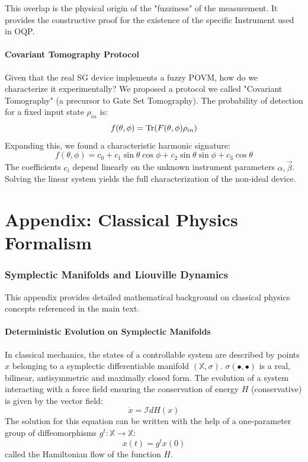 \documentclass[11pt,a4paper]{article}
\theoremstyle{definition}
\begin{document}
This overlap is the physical origin of the "fuzziness" of the measurement. It provides the constructive proof for the existence of the specific Instrument used in OQP.

\subsection{Covariant Tomography Protocol}
Given that the real SG device implements a fuzzy POVM, how do we characterize it experimentally? We proposed a protocol we called "Covariant Tomography" (a precursor to Gate Set Tomography).
The probability of detection for a fixed input state $\rho_{in}$ is:
\begin{equation}
    f(\theta, \phi) = \Tr(F(\theta, \phi) \rho_{in})
\end{equation}
Expanding this, we found a characteristic harmonic signature:
\begin{equation}
    f(\theta, \phi) = c_0 + c_1 \sin\theta \cos\phi + c_2 \sin\theta \sin\phi + c_3 \cos\theta
\end{equation}
The coefficients $c_i$ depend linearly on the unknown instrument parameters $\alpha, \vec{\beta}$. Solving the linear system yields the full characterization of the non-ideal device.

\part{Appendix: Classical Physics Formalism}

\section{Symplectic Manifolds and Liouville Dynamics}
\label{app:classical}

This appendix provides detailed mathematical background on classical physics concepts referenced in the main text.

\subsection{Deterministic Evolution on Symplectic Manifolds}

In classical mechanics, the states of a controllable system are described by points $x$ belonging to a symplectic differentiable manifold $(\mathbb{X}, \sigma)$. $\sigma(\bullet, \bullet)$ is a real, bilinear, antisymmetric and maximally closed form.
The evolution of a system interacting with a force field ensuring the conservation of energy $H$ (conservative) is given by the vector field:
\begin{equation}
    \dot{x} = \mathcal{I} dH(x)
\end{equation}
The solution for this equation can be written with the help of a one-parameter group of diffeomorphisms $g^t: \mathbb{X} \to \mathbb{X}$:
\begin{equation}
    x(t) = g^t x(0)
\end{equation}
called the Hamiltonian flow of the function $H$.
\end{document}
